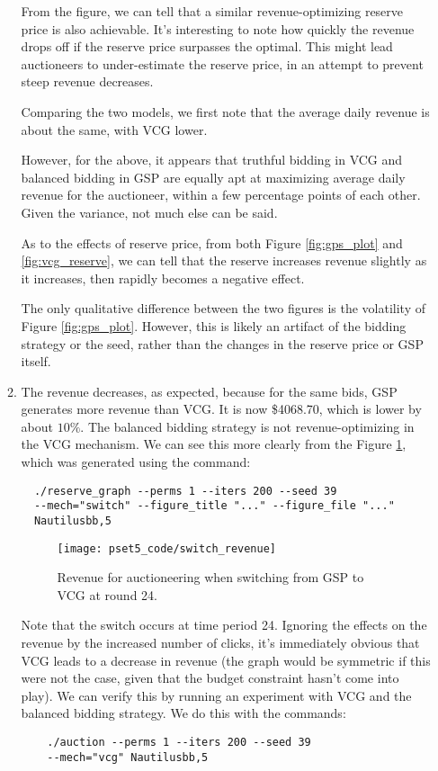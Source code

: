 \documentclass[11pt]{article}
\begin{document}
\begin{enumerate}[resume]
\begin{enumerate}
  From the figure, we can tell that a similar revenue-optimizing reserve price is also achievable. It's interesting to note how quickly the revenue drops off if the reserve price surpasses the optimal. This might lead auctioneers to under-estimate the reserve price, in an attempt to prevent steep revenue decreases.

  Comparing the two models, we first note that the average daily revenue is about the same, with VCG lower. 

  However, for the above, it appears that truthful bidding in VCG and balanced bidding in GSP are equally apt at maximizing average daily revenue for the auctioneer, within a few percentage points of each other. Given the variance, not much else can be said.

  As to the effects of reserve price, from both Figure \ref{fig:gps_plot} and \ref{fig:vcg_reserve}, we can tell that the reserve increases revenue slightly as it increases, then rapidly becomes a negative effect. 

  The only qualitative difference between the two figures is the volatility of Figure \ref{fig:gps_plot}. However, this is likely an artifact of the bidding strategy or the seed, rather than the changes in the reserve price or GSP itself.

  \item The revenue decreases, as expected, because for the same bids, GSP generates more revenue than VCG. It is now \$4068.70, which is lower by about $10\%$.  The balanced bidding strategy is not revenue-optimizing in the VCG mechanism. We can see this more clearly from the Figure \ref{fig:switch}, which was generated using the command:
   \begin{lstlisting}
  ./reserve_graph --perms 1 --iters 200 --seed 39 
  --mech="switch" --figure_title "..." --figure_file "..." 
  Nautilusbb,5
  \end{lstlisting}

  \begin{figure}[!h]
    \centering
    \texttt{[image: pset5\_code/switch\_revenue]}
    \caption{Revenue for auctioneering when switching from GSP to VCG at round 24.}
    \label{fig:switch}
  \end{figure}
  Note that the switch occurs at time period 24. Ignoring the effects on the revenue by the increased number of clicks, it's immediately obvious that VCG leads to a decrease in revenue (the graph would be symmetric if this were not the case, given that the budget constraint hasn't come into play). We can verify this by running an experiment with VCG and the balanced bidding strategy. We do this with the commands:
   \begin{lstlisting}
    ./auction --perms 1 --iters 200 --seed 39 
    --mech="vcg" Nautilusbb,5
    \end{lstlisting}


\end{enumerate}
\end{enumerate}
\end{document}
